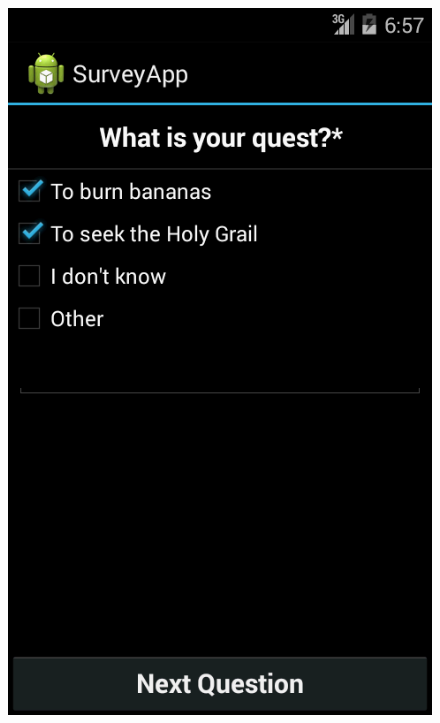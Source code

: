 \documentclass[runningheads,a4paper]{llncs}
\begin{document}
\begin{figure}[htb]
{	\includegraphics[scale=0.22]{images/android/android_2}}
	\quad
	\subfigure[Question 3]{
}
\end{figure}
\end{document}
